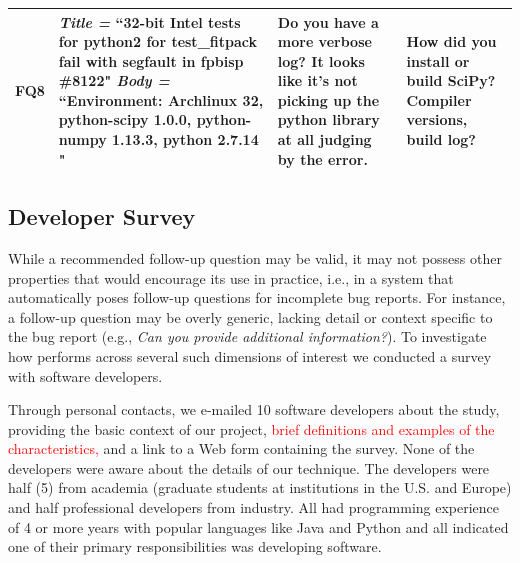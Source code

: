 \begin{table}[t]
\begin{tabular}{ |M{1cm}|p{7.3cm}|p{4cm}|p{4cm}|  }
		
		FQ8
		&{\em Title =} ``32-bit Intel tests for python2 for test\_fitpack fail with segfault in fpbisp \#8122" \newline
		{\em Body =} ``Environment: Archlinux 32, python-scipy 1.0.0, python-numpy 1.13.3, python 2.7.14 \newline
		[...]"
		& Do you have a more verbose log? It looks like it's not picking up the python library at all judging by the error. 
		& How did you install or build SciPy? Compiler versions, build log? \\ \hline
		
	\end{tabular}
\label{tab:survey}
\end{table}


\subsection{Developer Survey}
While a recommended follow-up question may be valid, it may not possess other properties that would
encourage its use in practice, i.e., in a system that automatically poses follow-up questions for incomplete bug reports. For
instance, a follow-up question may be overly generic, lacking detail or context specific to the bug report (e.g., {\em Can you provide
additional information?}). To investigate how \evpi performs across several such dimensions of interest we conducted a survey with
software developers.

Through personal contacts, we e-mailed 10 software developers about the study, providing the basic context of our project, \textcolor{red}{brief definitions and examples of the characteristics,} and a link to a Web form containing the survey. None of the developers were aware about the details of our technique. The developers were half (5) from academia (graduate students at institutions in the U.S. and Europe) and half professional developers from industry. All had programming experience of 4 or more years with popular languages like Java and Python and all indicated one of their primary responsibilities was developing software.

